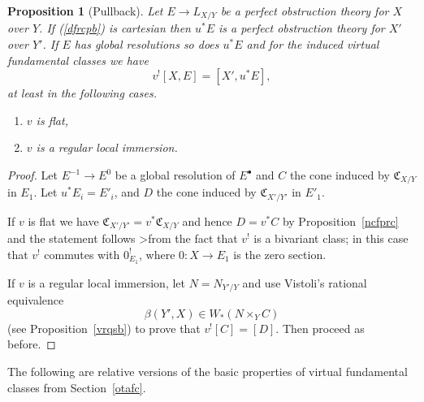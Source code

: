 \documentclass[11pt]{article}
\theoremstyle{plain}
\newtheorem{prop}{Proposition}[section]
\theoremstyle{definition}
\newenvironment{pf}{\begin{proof}}{\end{proof}}
\newcommand{\upst}{^{\ast}}
\newcommand{\upsh}{^{!}}
\newcommand{\lst}{_{\ast}}
\newcommand{\com}{^{\scriptscriptstyle\bullet}}
\newcommand{\CC}{{\mathfrak{C}}}
\theoremstyle{plain}
\theoremstyle{definition}
\theoremstyle{remark}
\begin{document}
\begin{prop}[Pullback]\label{pull}
Let \(E\rightarrow L_{X/Y}\) be a perfect obstruction theory for \(X\)
over \(Y\). If (\ref{dfrcpb}) is cartesian then \(u\upst E\) is a perfect
obstruction theory for \(X'\) over \(Y'\). If \(E\) has global resolutions
so does \(u\upst E\) and for the induced virtual fundamental classes we
have
\[
v\upsh[X,E]=[X',u\upst E],
\]
at least in the following cases.
\begin{enumerate}
\item \(v\) is flat,
\item \(v\) is a regular local immersion.
\end{enumerate}
\end{prop}
\begin{pf}
Let \(E^{-1}\to E^0\) be a global resolution of \(E\com\) and \(C\) the cone
induced by \(\CC_{X/Y}\) in \(E_1\). Let \(u\upst E_i=E'_i\), and \(D\) the
cone induced by \(\CC_{X'/Y'}\) in \(E'_1\).

If \(v\) is flat we have \(\CC_{X'/Y'}=v\upst\CC_{X/Y}\) and hence
\(D=v\upst C\) by Proposition~\ref{ncfprc} and the statement follows
>from the fact that \(v\upsh\) is a bivariant class; in this case that
\(v\upsh\) commutes with \(0\upsh_{E_1}\), where \(0:X\to E_1\) is the zero
section.

If \(v\) is a regular local immersion, let \(N=N_{Y'/Y}\) and use
Vistoli's rational equivalence
\[
\beta(Y',X)\in W\lst(N\times_Y C)
\]
(see Proposition~\ref{vrqsb}) to prove that \(v\upsh[C]=[D]\). Then
proceed as before.
\end{pf}

The following are relative versions of the basic properties of virtual
fundamental classes from Section~\ref{otafc}.
\end{document}
